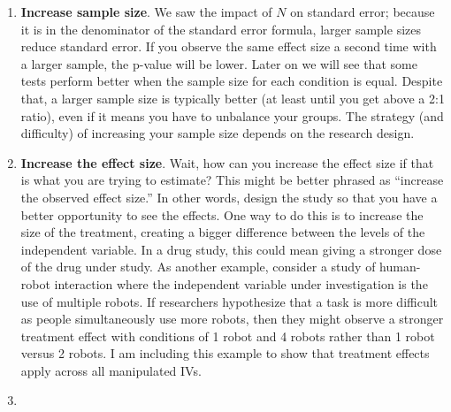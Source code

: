 \documentclass[
]{book}
\begin{document}
\begin{enumerate}
\def\labelenumi{\arabic{enumi}.}
\item
  \textbf{Increase sample size}. We saw the impact of \(N\) on standard error; because it is in the denominator of the standard error formula, larger sample sizes reduce standard error. If you observe the same effect size a second time with a larger sample, the p-value will be lower. Later on we will see that some tests perform better when the sample size for each condition is equal. Despite that, a larger sample size is typically better (at least until you get above a 2:1 ratio), even if it means you have to unbalance your groups. The strategy (and difficulty) of increasing your sample size depends on the research design.
\item
  \textbf{Increase the effect size}. Wait, how can you increase the effect size if that is what you are trying to estimate? This might be better phrased as ``increase the observed effect size.'' In other words, design the study so that you have a better opportunity to see the effects. One way to do this is to increase the size of the treatment, creating a bigger difference between the levels of the independent variable. In a drug study, this could mean giving a stronger dose of the drug under study. As another example, consider a study of human-robot interaction where the independent variable under investigation is the use of multiple robots. If researchers hypothesize that a task is more difficult as people simultaneously use more robots, then they might observe a stronger treatment effect with conditions of 1 robot and 4 robots rather than 1 robot versus 2 robots. I am including this example to show that treatment effects apply across all manipulated IVs.
\item

\end{enumerate}
\end{document}
